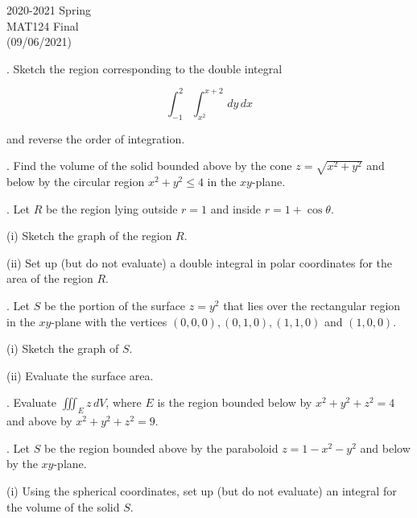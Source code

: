 \documentclass{article}
\begin{document}
\large

\begin{center}
2020-2021 Spring \\MAT124 Final\\(09/06/2021)
\end{center}

. Sketch the region corresponding to the double integral

\[\int_{-1}^2\int_{x^2}^{x+2}\,dy\,dx\]

\hfill

\noindent and reverse the order of integration.

\hfill

. Find the volume of the solid bounded above by the cone $z=\sqrt{x^2+y^2}$ and below by the circular region $x^2+y^2\leq4$ in the $xy$-plane.

\hfill

. Let $R$ be the region lying outside $r=1$ and inside $r=1+\cos\theta$.

\hfill

\noindent (i) Sketch the graph of the region $R$.

\hfill

\noindent (ii) Set up (but do not evaluate) a double integral in polar coordinates for the area of the region $R$.

\hfill

. Let $S$ be the portion of the surface $z=y^2$ that lies over the rectangular region in the $xy$-plane with the vertices $(0,0,0), (0,1,0), (1,1,0)$ and $(1,0,0)$.

\hfill

\noindent (i) Sketch the graph of $S$.

\hfill

\noindent (ii) Evaluate the surface area.

\hfill

. Evaluate $\displaystyle \iiint_E z\,dV$, where $E$ is the region bounded below by $x^2+y^2+z^2=4$ and above by $x^2+y^2+z^2=9$.

\hfill

. Let $S$ be the region bounded above by the paraboloid $z=1-x^2-y^2$ and below by the $xy$-plane.

\hfill

\noindent (i) Using the spherical coordinates, set up (but do not evaluate) an integral for the volume of the solid $S$.

\hfill
\end{document}

